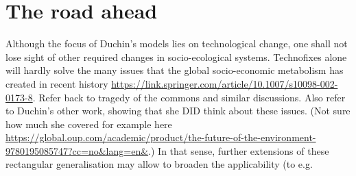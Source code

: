 \section{The road ahead}

Although the focus of Duchin's models lies on technological change, one shall not lose sight of other required changes in socio-ecological systems. Technofixes alone will hardly solve the many issues that the global socio-economic metabolism has created in recent history \url{https://link.springer.com/article/10.1007/s10098-002-0173-8}. Refer back to tragedy of the commons and similar discussions. Also refer to Duchin's other work, showing that she DID think about these issues. (Not sure how much she covered for example here \url{https://global.oup.com/academic/product/the-future-of-the-environment-9780195085747?cc=no&lang=en&}.) In that sense, further extensions of these rectangular generalisation may allow to broaden the applicability (to e.g. 

